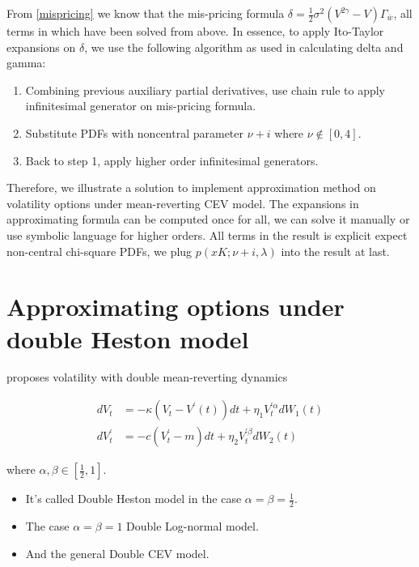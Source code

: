 From \eqref{mispricing} we know that the mis-pricing formula $\delta = \frac{1}{2} \sigma^2 (V^{2\gamma}-V) \Gamma_{\bar{w}}$, all terms in which have been solved from above. In essence, to apply Ito-Taylor expansions on $\delta$, we use the following algorithm as used in calculating delta and gamma:

\begin{enumerate}
    \item Combining previous auxiliary partial derivatives, use chain rule to apply infinitesimal generator on mis-pricing formula.
    \item Substitute PDFs with noncentral parameter $\nu+i$ where $\nu \notin [0,4]$.
    \item Back to step 1, apply higher order infinitesimal generators.
\end{enumerate}

Therefore, we illustrate a solution to implement approximation method on volatility options under mean-reverting CEV model. The expansions in approximating formula can be computed once for all, we can solve it manually or use symbolic language for higher orders. All terms in the result is explicit expect non-central chi-square PDFs, we plug $p(xK;\nu+i,\lambda)$ into the result at last.

\section{Approximating options under double Heston model}

\cite{gatheral_consistent_nodate} proposes volatility with double mean-reverting dynamics

$$
    \begin{aligned}
        d V_t &=-\kappa\left(V_t-V^{\prime}(t)\right) d t+\eta_{1} V^{\prime \alpha}_t  d W_1(t) \\
        d V^{\prime}_t &=-c\left(V^{\prime}_t-m\right) d t+\eta_{2} V^{\prime \beta}_t d W_{2}(t)
    \end{aligned}
$$

\noindent where $\alpha, \beta \in [\frac{1}{2},1]$.

\begin{itemize}
    \item It's called Double Heston model in the case $\alpha=\beta=\frac{1}{2}$.
    \item The case $\alpha=\beta=1$ Double Log-normal model.
    \item And the general Double CEV model.
\end{itemize}

